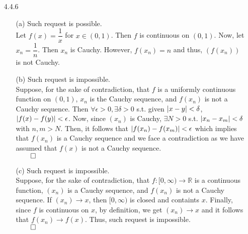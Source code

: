 \documentclass[11pt]{article}
\DeclarePairedDelimiter\abs{\lvert}{\rvert}%
\newcommand{\reals}{\mathbb{R}}
\begin{document}
\begin{itemize}
    \item[4.4.6]
        \begin{itemize}
            \item[(a)]
                Such request is possible.\\
                Let $f(x) = \dfrac{1}{x}$ for $x \in (0, 1)$. Then $f$ is
                continuous on $(0, 1)$. Now, let $x_n = \dfrac{1}{n}$.  Then
                $x_n$ is Cauchy. However, $f(x_n) = n$ and thus, $(f(x_n))$ is
                not Cauchy.

            \item[(b)]
                Such request is impossible.\\ Suppose, for the sake of
                contradiction, that $f$ is a uniformly continuous function on
                $(0, 1)$, $x_n$ is the Cauchy sequence, and $f(x_n)$ is not a
                Cauchy sequence. Then $\forall \epsilon > 0, \exists \delta >
                0$ s.t.  given $\abs{x - y} < \delta$, $\abs{f(x) - f(y)} <
                \epsilon$.  Now, since $(x_n)$ is Cauchy, $\exists N > 0$ s.t.
                $\abs{x_n - x_m} < \delta$ with $n, m > N$. Then, it follows
                that $\abs{f(x_n) - f(x_m)} < \epsilon$ which implies that
                $f(x_n)$ is a Cauchy sequence and we face a contradiction as we
                have assumed that $f(x)$ is not a Cauchy sequence.\\
                $\qed$

            \item[(c)]
                Such request is impossible.\\
                Suppose, for the sake of contradiction, that $f : [0, \infty)
                \to \reals$ is a continuous function, $(x_n)$ is a Cauchy
                sequence, and $f(x_n)$ is not a Cauchy sequence. If $(x_n) \to
                x$, then $[0, \infty)$ is closed and containts $x$. Finally,
                since $f$ is continuous on $x$, by definition, we get $(x_n)
                \to x$ and it follows that $f(x_n) \to f(x)$. Thus, such
                request is impossible.\\
                $\qed$
        \end{itemize}


\end{itemize}
\end{document}
